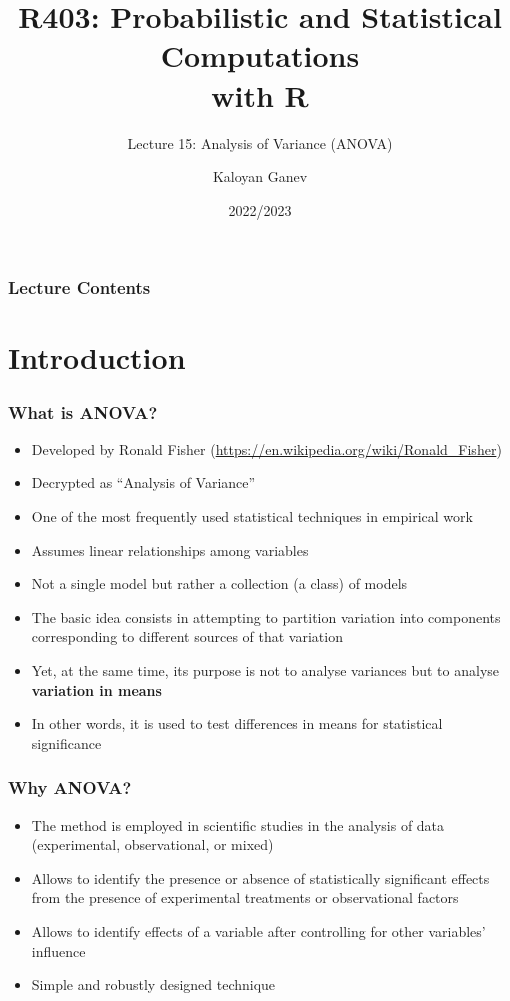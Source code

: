 \documentclass[10pt]{beamer}
\title{R403: Probabilistic and Statistical Computations\\ with R}
\subtitle{Lecture 15: \textcolor{myred}{Analysis of Variance (ANOVA)}}
\author{Kaloyan Ganev}
\date{2022/2023}
\theoremstyle{definition}
\begin{document}
\maketitle

\begin{frame}[fragile]
\frametitle{Lecture Contents}
\tableofcontents
\end{frame}

\section{Introduction}
\begin{frame}[fragile]
\frametitle{What is ANOVA?}
\begin{itemize}
	\item Developed by Ronald Fisher (\url{https://en.wikipedia.org/wiki/Ronald_Fisher})
	\item Decrypted as ``Analysis of Variance''
	\item One of the most frequently used statistical techniques in empirical work
	\item Assumes linear relationships among variables
	\item Not a single model but rather a collection (a class) of models
	\item The basic idea consists in attempting to partition variation into components corresponding to different sources of that variation
	\item Yet, at the same time, its purpose is not to analyse variances but to analyse \textbf{variation in means}
	\item In other words, it is used to test differences in means for statistical significance
\end{itemize}
\end{frame}

\begin{frame}[fragile]
\frametitle{Why ANOVA?}
\begin{itemize}
	\item The method is employed in  scientific studies in the analysis of data (experimental, observational, or mixed)
	\item Allows to identify the presence or absence of statistically significant effects from the presence of experimental treatments or observational factors
	\item Allows to identify effects of a variable after controlling for other variables' influence
	\item Simple and robustly designed technique
\end{itemize} 
\end{frame}
\end{document}
